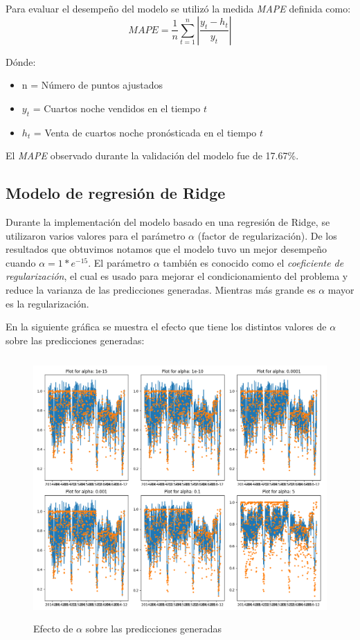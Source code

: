 Para evaluar el desempeño del modelo se utilizó la medida \emph{MAPE} definida como: $$MAPE=\frac{1}{n}\sum_{t=1}^{n}|\frac{y_t-h_t}{y_t}|$$

Dónde:
\begin{itemize}[noitemsep]
  \item n = Número de puntos ajustados
  \item $y_t$ = Cuartos noche vendidos en el tiempo $t$
  \item $h_t$ = Venta de cuartos noche pronósticada en el tiempo $t$
\end{itemize}


El \emph{MAPE} observado durante la validación del modelo fue de 17.67\%.

\subsection*{Modelo de regresión de Ridge}

Durante la implementación del modelo basado en una regresión de Ridge, se utilizaron varios valores para el parámetro $\alpha$ (factor de regularización). De los resultados que obtuvimos notamos que el modelo tuvo un mejor desempeño cuando $\alpha = 1*e^{-15}$. El parámetro $\alpha$ también es conocido como el \emph{coeficiente de regularización}, el cual es usado para mejorar el condicionamiento del problema y reduce la varianza de las predicciones generadas. Mientras más grande es $\alpha$ mayor es la regularización. 

En la siguiente gráfica se muestra el efecto que tiene los distintos valores de $\alpha$ sobre las predicciones generadas:

\begin{figure}[H]
  \centering
      \includegraphics[width=\maxwidth,height=10cm]{figures/alphas_ridge.png}  
  \caption{Efecto de $\alpha$ sobre las predicciones generadas}
\end{figure}

